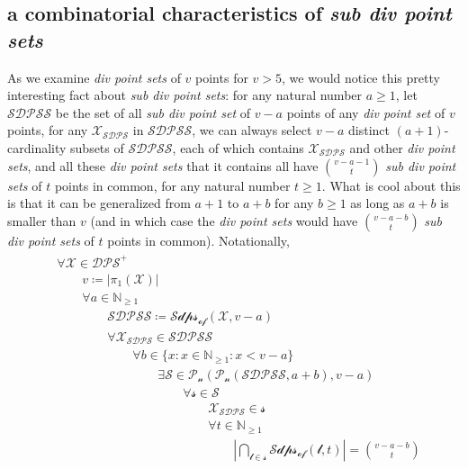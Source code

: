 \documentclass[11pt, oneside]{article}      %
\theoremstyle{definition}
\numberwithin{equation}{section}
\theoremstyle{c}
\begin{document}
\subsection{a combinatorial characteristics of \textit{sub div point sets}}

As we examine \textit{div point sets} of $v$ points for $v > 5$, we would notice this pretty interesting fact about \textit{sub div point sets}: for any natural number $a \geq 1$, let $\mathscr{SDPSS}$ be the set of all \textit{sub div point set} of $v-a$ points of any \textit{div point set} of $v$ points, for any $\mathscr{X_{SDPS}}$ in $\mathscr{SDPSS}$, we can always select $v-a$ distinct $(a+1)$-cardinality subsets of $\mathscr{SDPSS}$, each of which contains $\mathscr{X_{SDPS}}$ and other \textit{div point sets}, and all these \textit{div point sets} that it contains all have $\binom{v-a-1}{t}$ \textit{sub div point sets} of $t$ points in common, for any natural number $t \geq 1$. What is cool about this is that it can be generalized from $a+1$ to $a+b$ for any $b \geq 1$ as long as $a+b$ is smaller than $v$ (and in which case the \textit{div point sets} would have $\binom{v-a-b}{t}$ \textit{sub div point sets} of $t$ points in common). Notationally,
\begin{align}
\begin{split}\label{combinatorics}
&\forall \mathscr{X} \in \mathscr{DPS}^+ \\
&\qquad v \coloneqq |\pi_1(\mathscr{X})| \\
& \qquad \forall a \in \mathbb{N}_{\geq 1} \\
&\qquad \qquad \mathscr{SDPSS} \coloneqq \mathscr{Sdps_{of}}(\mathscr{X}, v-a)\\
&\qquad \qquad \forall  \mathscr{X_{SDPS}}  \in \mathscr{SDPSS} \\
&\qquad \qquad \qquad \forall b \in \{ x: x \in \mathbb{N}_{\geq 1} : x < v-a \}  \\
&\qquad \qquad \qquad \qquad \exists \mathscr{S} \in \mathcal{P_n}( \mathcal{P_n}(\mathscr{SDPSS}, a+b),v-a)\\
&\qquad \qquad \qquad \qquad \qquad \forall \mathscr{s} \in \mathscr{S} \\
&\qquad \qquad \qquad \qquad \qquad \qquad \mathscr{X_{SDPS}} \in \mathscr{s}\\
& \qquad \qquad \qquad \qquad \qquad \qquad  \forall t \in \mathbb{N}_{\geq 1}  \\
&\qquad  \qquad \qquad \qquad \qquad \qquad \qquad |\bigcap_{\mathcal{l} \in \mathscr{s}} \mathscr{Sdps_{of}}(\mathcal{l},t)| =   \binom{v-a-b}{t}\\
\end{split}
\end{align}
\end{document}
